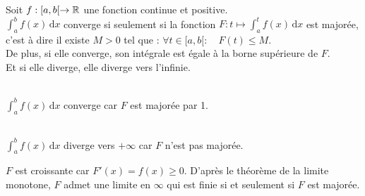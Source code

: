 \documentclass{book}
\begin{document}
\begin{Proposition}
Soit $f:[a,b[\to\mathbb{R}$ une fonction continue et positive.\\
$\int_a^b f(x)\,\mathrm dx$ converge si seulement si la fonction $F:t\mapsto \int_a^t f(x)\,\mathrm dx$ est majorée, c'est à dire il existe $M > 0$ tel que : $\forall t \in [a,b [:\quad 
F(t)\leq M$.\\
De plus, si elle converge, son intégrale est égale à la borne supérieure
de $F$.\\
Et si elle diverge, elle diverge vers l'infinie.
\begin{center}
\\
$\int_a^b f(x)\,\mathrm dx$ converge car $F$ est majorée par 1.
\end{center}

\begin{center}
\\
$\int_a^b f(x)\,\mathrm dx$ diverge vers $+\infty$ car $F$ n'est pas majorée.
\end{center}
\end{Proposition}
\begin{Demonstration}
$F$ est croissante car $F'(x)=f(x)\geq 0$. D'après le théorème de
la limite monotone, $F$ admet une limite en $\infty$ qui est finie si et seulement si $F$ est majorée.
\end{Demonstration}
\end{document}
